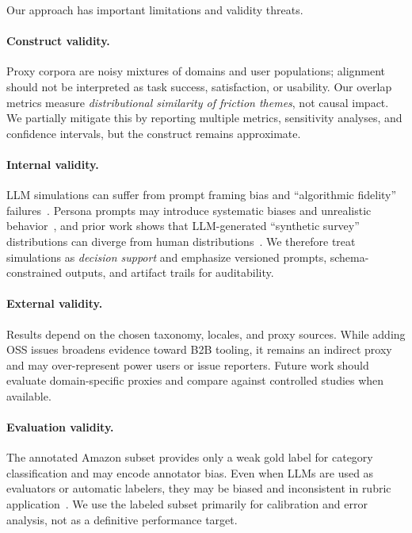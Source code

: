 \label{sec:limitations}
Our approach has important limitations and validity threats.
\paragraph{Construct validity.}
Proxy corpora are noisy mixtures of domains and user populations; alignment should not be interpreted as task success, satisfaction, or usability.
Our overlap metrics measure \emph{distributional similarity of friction themes}, not causal impact.
We partially mitigate this by reporting multiple metrics, sensitivity analyses, and confidence intervals, but the construct remains approximate.

\paragraph{Internal validity.}
LLM simulations can suffer from prompt framing bias and ``algorithmic fidelity'' failures~\cite{amirova2024algorithmicfidelity,gao2024scylla}.
Persona prompts may introduce systematic biases and unrealistic behavior~\cite{li2025personacatch,prpa2024syntheticpersonae}, and prior work shows that
LLM-generated ``synthetic survey'' distributions can diverge from human distributions~\cite{bisbee2024perils}.
We therefore treat simulations as \emph{decision support} and emphasize versioned prompts, schema-constrained outputs, and artifact trails for auditability.

\paragraph{External validity.}
Results depend on the chosen taxonomy, locales, and proxy sources.
While adding OSS issues broadens evidence toward B2B tooling, it remains an indirect proxy and may over-represent power users or issue reporters.
Future work should evaluate domain-specific proxies and compare against controlled studies when available.

\paragraph{Evaluation validity.}
The annotated Amazon subset provides only a weak gold label for category classification and may encode annotator bias.
Even when LLMs are used as evaluators or automatic labelers, they may be biased and inconsistent in rubric application~\cite{liu2023geval,zheng2023mtbench,wang2024notfair}.
We use the labeled subset primarily for calibration and error analysis, not as a definitive performance target.


